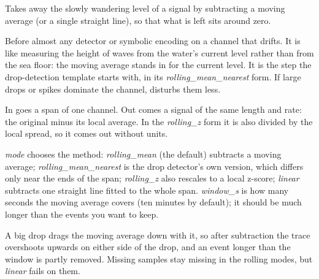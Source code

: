Takes away the slowly wandering level of a signal by subtracting a moving average (or a single
straight line), so that what is left sits around zero.

Before almost any detector or symbolic encoding on a channel that drifts. It is like measuring
the height of waves from the water's current level rather than from the sea floor: the moving
average stands in for the current level. It is the step the drop-detection template starts
with, in its \emph{rolling\_mean\_nearest} form. If large drops or spikes dominate the
channel,  disturbs them less.

In goes a span of one channel. Out comes a signal of the same length and rate: the original
minus its local average. In the \emph{rolling\_z} form it is also divided by the local spread,
so it comes out without units.

\emph{mode} chooses the method: \emph{rolling\_mean} (the default) subtracts a moving average;
\emph{rolling\_mean\_nearest} is the drop detector's own version, which differs only near the
ends of the span; \emph{rolling\_z} also rescales to a local z-score; \emph{linear} subtracts
one straight line fitted to the whole span. \emph{window\_s} is how many seconds the moving
average covers (ten minutes by default); it should be much longer than the events you want to
keep.

A big drop drags the moving average down with it, so after subtraction the trace overshoots
upwards on either side of the drop, and an event longer than the window is partly removed.
Missing samples stay missing in the rolling modes, but \emph{linear} fails on them.
